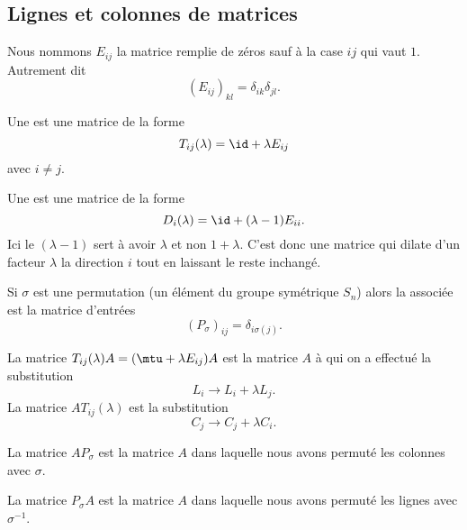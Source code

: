 \subsection{Lignes et colonnes de matrices}

Nous nommons \( E_{ij}\) la matrice remplie de zéros sauf à la case \( ij\) qui vaut \( 1\). Autrement dit
\begin{equation}
    (E_{ij})_{kl}=\delta_{ik}\delta_{jl}.
\end{equation}
\begin{definition}
    Une  est une matrice de la forme
    \begin{equation}
        T_{ij}(\lambda)=\id+\lambda E_{ij}
    \end{equation}
    avec \( i\neq j\).

    Une  est une matrice de la forme
    \begin{equation}
        D_i(\lambda)=\id+(\lambda-1)E_{ii}.
    \end{equation}
    Ici le \( (\lambda-1)\) sert à avoir \( \lambda\) et non \( 1+\lambda\). C'est donc une matrice qui dilate d'un facteur \( \lambda\) la direction \( i\) tout en laissant le reste inchangé.

    Si \( \sigma\) est une permutation (un élément du groupe symétrique \( S_n\)) alors la  associée est la matrice d'entrées
    \begin{equation}
        (P_{\sigma})_{ij}=\delta_{i\sigma(j)}.
    \end{equation}
\end{definition}

\begin{lemma}   \label{LemyrAXQs}
    La matrice \( T_{ij}(\lambda)A=(\mtu+\lambda E_{ij})A\) est la matrice \( A\) à qui on a effectué la substitution
    \begin{equation}
        L_i\to L_i+\lambda L_j.
    \end{equation}
    La matrice \( AT_{ij}(\lambda)\) est la substitution 
    \begin{equation}
        C_j\to C_j+\lambda C_i.
    \end{equation}

    La matrice \( AP_{\sigma}\) est la matrice \( A\) dans laquelle nous avons permuté les colonnes avec \( \sigma\).

    La matrice \( P_{\sigma}A\) est la matrice \( A\) dans laquelle nous avons permuté les lignes avec \( \sigma^{-1}\).
\end{lemma}

